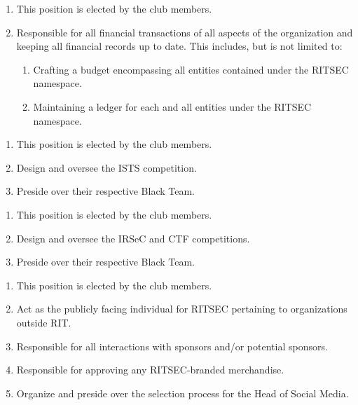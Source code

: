 
\begin{enumerate}
	\item This position is elected by the club members.
	\item Responsible for all financial transactions of all aspects of the organization
	      and keeping all financial records up to date. This includes, but is not limited
	      to:
	      \begin{enumerate}
		      \item Crafting a budget encompassing all entities contained under the RITSEC
		            namespace.
		      \item Maintaining a ledger for each and all entities under the RITSEC namespace.
	      \end{enumerate}
\end{enumerate}


\begin{enumerate}
	\item This position is elected by the club members.
	\item Design and oversee the ISTS competition.
	\item Preside over their respective Black Team.
\end{enumerate}


\begin{enumerate}
	\item This position is elected by the club members.
	\item Design and oversee the IRSeC and CTF competitions.
	\item Preside over their respective Black Team.
\end{enumerate}


\begin{enumerate}
	\item This position is elected by the club members.
	\item Act as the publicly facing individual for RITSEC pertaining to organizations
	      outside RIT.
	\item Responsible for all interactions with sponsors and/or potential sponsors.
	\item Responsible for approving any RITSEC-branded merchandise.
	\item Organize and preside over the selection process for the Head of Social Media.
\end{enumerate}

